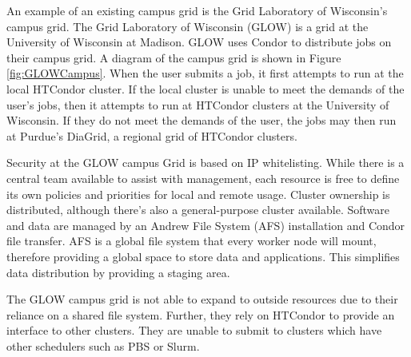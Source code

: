 An example of an existing campus grid is the Grid Laboratory of Wisconsin's campus grid.  The Grid Laboratory of Wisconsin (GLOW) \cite{gridworkshopweb, glowwebsite} is a grid at the University of Wisconsin at Madison.  GLOW uses Condor to distribute 
jobs on their campus grid.  A diagram of the campus grid is shown in Figure \ref{fig:GLOWCampus}.  When the user submits a job, it first attempts to run at the local HTCondor cluster.  If the local cluster is unable to meet the demands of the user's jobs, then it attempts to run at HTCondor clusters at the University of Wisconsin.  If they do not meet the demands of the user, the jobs may then run at Purdue's DiaGrid, a regional grid of HTCondor clusters.

Security at the GLOW campus Grid is based on IP whitelisting.  While there is a central 
team available to assist with management, each resource is free to define its own policies and priorities for local 
and remote usage.  Cluster ownership is distributed, although there's also a general-purpose cluster available.  
Software and data are managed by an Andrew File System (AFS) \cite{morris1986andrew} installation and Condor file transfer.  AFS is a global file system
that every worker node will mount, therefore providing a global space to store data and applications.  This simplifies data distribution
by providing a staging area.

The GLOW campus grid is not able to expand to outside resources due to their reliance on a shared file system.  Further, they rely on HTCondor to provide an interface to other clusters.  They are unable to submit to clusters which have other schedulers such as PBS or Slurm.  


